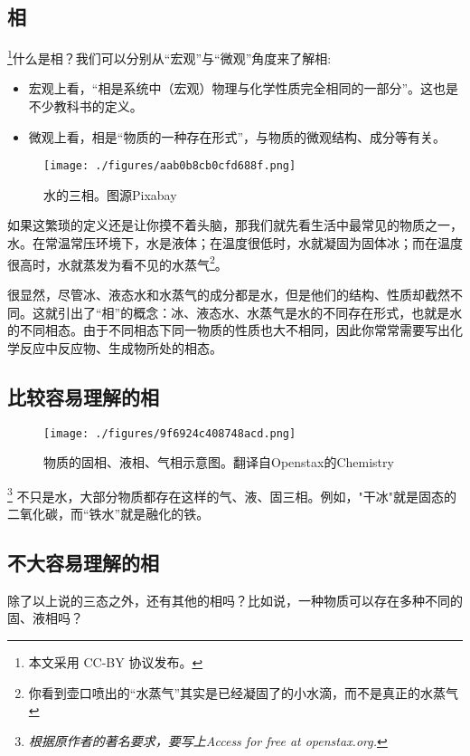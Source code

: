 
\subsection{相}
\footnote{本文采用 CC-BY 协议发布。}什么是相？我们可以分别从“宏观”与“微观”角度来了解相:
\begin{itemize}
\item 宏观上看，“相是系统中（宏观）物理与化学性质完全相同的一部分”。这也是不少教科书的定义。
\item 微观上看，相是“物质的一种存在形式”，与物质的微观结构、成分等有关。
\end{itemize}

\begin{figure}[ht]
\centering
\texttt{[image: ./figures/aab0b8cb0cfd688f.png]}
\caption{水的三相。图源Pixabay} \label{fig_PHS_1}
\end{figure}
如果这繁琐的定义还是让你摸不着头脑，那我们就先看生活中最常见的物质之一，水。在常温常压环境下，水是液体；在温度很低时，水就凝固为固体冰；而在温度很高时，水就蒸发为看不见的水蒸气\footnote{你看到壶口喷出的“水蒸气”其实是已经凝固了的小水滴，而不是真正的水蒸气}。

很显然，尽管冰、液态水和水蒸气的成分都是水，但是他们的结构、性质却截然不同。这就引出了“相”的概念：冰、液态水、水蒸气是水的不同存在形式，也就是水的不同相态。由于不同相态下同一物质的性质也大不相同，因此你常常需要写出化学反应中反应物、生成物所处的相态。

\subsection{比较容易理解的相}
\begin{figure}[ht]
\centering
\texttt{[image: ./figures/9f6924c408748acd.png]}
\caption{物质的固相、液相、气相示意图。翻译自Openstax的Chemistry} \label{fig_PHS_2}
\end{figure}
\footnote{\textsl{根据原作者的著名要求，要写上Access for free at openstax.org.}}
不只是水，大部分物质都存在这样的气、液、固三相。例如，"干冰"就是固态的二氧化碳，而“铁水”就是融化的铁。

\subsection{不大容易理解的相}
除了以上说的三态之外，还有其他的相吗？比如说，一种物质可以存在多种不同的固、液相吗？

